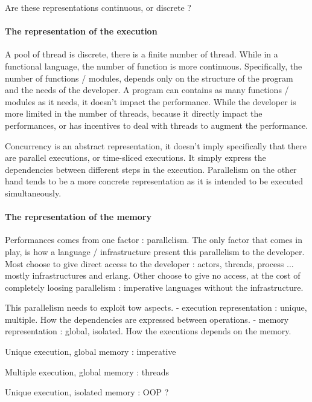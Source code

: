 Are these representations continuous, or discrete ?

\paragraph{The representation of the execution}
A pool of thread is discrete, there is a finite number of thread.
While in a functional language, the number of function is more continuous.
Specifically, the number of functions / modules, depends only on the structure of the program and the needs of the developer.
A program can contains as many functions / modules as it needs, it doesn't impact the performance.
While the developer is more limited in the number of threads, because it directly impact the performances, or has incentives to deal with threads to augment the performance.

Concurrency is an abstract representation, it doesn't imply specifically that there are parallel executions, or time-sliced executions.
It simply express the dependencies between different steps in the execution.
Parallelism on the other hand tends to be a more concrete representation as it is intended to be executed simultaneously.

\paragraph{The representation of the memory}







Performances comes from one factor : parallelism.
The only factor that comes in play, is how a language / infrastructure present this parallelism to the developer.
Most choose to give direct access to the developer : actors, threads, process ... mostly infrastructures and erlang.
Other choose to give no access, at the cost of completely loosing parallelism : imperative languages without the infrastructure.

This parallelism needs to exploit tow aspects.
- execution representation : unique, multiple.
How the dependencies are expressed between operations.
- memory representation : global, isolated.
How the executions depends on the memory.

Unique execution, global memory : imperative

Multiple execution, global memory : threads

Unique execution, isolated memory : OOP ?

